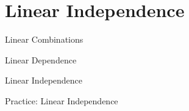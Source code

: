 \section{Linear Independence}

\begin{frame}{Linear Combinations}

\end{frame}

\begin{frame}{Linear Dependence}

\end{frame}

\begin{frame}{Linear Independence}

\end{frame}

\begin{frame}{Practice: Linear Independence}

\end{frame}
